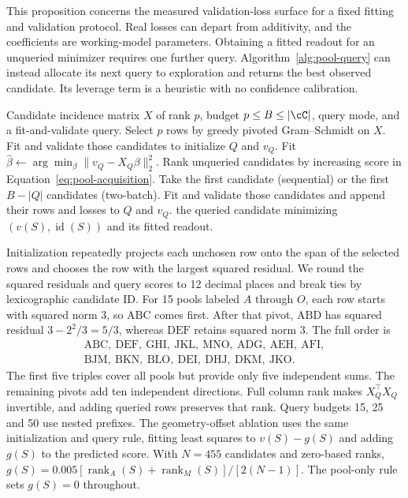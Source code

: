 This proposition concerns the measured validation-loss surface for a fixed fitting and validation protocol. Real losses can depart from additivity, and the coefficients are working-model parameters. Obtaining a fitted readout for an unqueried minimizer requires one further query. Algorithm~\ref{alg:pool-query} can instead allocate its next query to exploration and returns the best observed candidate. Its leverage term is a heuristic with no confidence calibration.

\begin{algorithm}[H]
\caption{Pool querying with validation feedback}
\label{alg:pool-query}
\begin{algorithmic}[1]
\Require Candidate incidence matrix $X$ of rank $p$, budget $p\leq B\leq|\cC|$, query mode, and a fit-and-validate query.
\State Select $p$ rows by greedy pivoted Gram--Schmidt on $X$.
\State Fit and validate those candidates to initialize $Q$ and $v_Q$.
  \State Fit $\widehat\beta\gets\arg\min_\beta\|v_Q-X_Q\beta\|_2^2$.
  \State Rank unqueried candidates by increasing score in Equation~\eqref{eq:pool-acquisition}.
  \State Take the first candidate (sequential) or the first $B-|Q|$ candidates (two-batch).
  \State Fit and validate those candidates and append their rows and losses to $Q$ and $v_Q$.
\EndWhile
\State \Return the queried candidate minimizing $(v(S),\operatorname{id}(S))$ and its fitted readout.
\end{algorithmic}
\end{algorithm}

Initialization repeatedly projects each unchosen row onto the span of the selected rows and chooses the row with the largest squared residual. We round the squared residuals and query scores to 12 decimal places and break ties by lexicographic candidate ID. For 15 pools labeled $A$ through $O$, each row starts with squared norm $3$, so $\mathrm{ABC}$ comes first. After that pivot, $\mathrm{ABD}$ has squared residual $3-2^2/3=5/3$, whereas $\mathrm{DEF}$ retains squared norm $3$. The full order is
\[
\begin{gathered}
 \mathrm{ABC,\ DEF,\ GHI,\ JKL,\ MNO,\ ADG,\ AEH,\ AFI,}\\
 \mathrm{BJM,\ BKN,\ BLO,\ DEI,\ DHJ,\ DKM,\ JKO}.
\end{gathered}
\]
The first five triples cover all pools but provide only five independent sums. The remaining pivots add ten independent directions. Full column rank makes $X_Q^\top X_Q$ invertible, and adding queried rows preserves that rank. Query budgets 15, 25 and 50 use nested prefixes. The geometry-offset ablation uses the same initialization and query rule, fitting least squares to $v(S)-g(S)$ and adding $g(S)$ to the predicted score. With $N=455$ candidates and zero-based ranks, $g(S)=0.005[\operatorname{rank}_A(S)+\operatorname{rank}_M(S)]/[2(N-1)]$. The pool-only rule sets $g(S)=0$ throughout.

